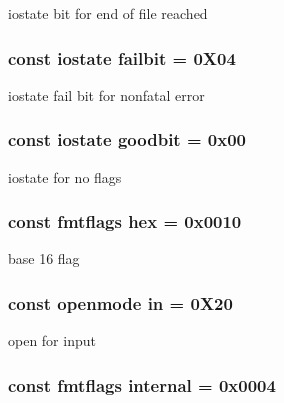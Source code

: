iostate bit for end of file reached \hypertarget{classios__base_ad4b89a6da8c3959a7efa16a5d05c211a}{
\subsubsection[{failbit}]{\setlength{\rightskip}{0pt plus 5cm}const {\bf iostate} failbit = 0\-X04\hspace{0.3cm}{\ttfamily [static]}}}\label{classios__base_ad4b89a6da8c3959a7efa16a5d05c211a}
iostate fail bit for nonfatal error \hypertarget{classios__base_ada0c8aa0797472d458523a3c2c475cdb}{
\subsubsection[{goodbit}]{\setlength{\rightskip}{0pt plus 5cm}const {\bf iostate} goodbit = 0x00\hspace{0.3cm}{\ttfamily [static]}}}\label{classios__base_ada0c8aa0797472d458523a3c2c475cdb}
iostate for no flags \hypertarget{classios__base_a14a0660d3467c093faf74d3876dccd78}{
\subsubsection[{hex}]{\setlength{\rightskip}{0pt plus 5cm}const {\bf fmtflags} hex = 0x0010\hspace{0.3cm}{\ttfamily [static]}}}\label{classios__base_a14a0660d3467c093faf74d3876dccd78}
base 16 flag \hypertarget{classios__base_a371ab336bfce00a620526ba26f9be813}{
\subsubsection[{in}]{\setlength{\rightskip}{0pt plus 5cm}const {\bf openmode} in = 0\-X20\hspace{0.3cm}{\ttfamily [static]}}}\label{classios__base_a371ab336bfce00a620526ba26f9be813}
open for input \hypertarget{classios__base_aea76c8967ab6a2be9edeefbdb2118e61}{
\subsubsection[{internal}]{\setlength{\rightskip}{0pt plus 5cm}const {\bf fmtflags} internal = 0x0004\hspace{0.3cm}{\ttfamily [static]}}}\label{classios__base_aea76c8967ab6a2be9edeefbdb2118e61}
